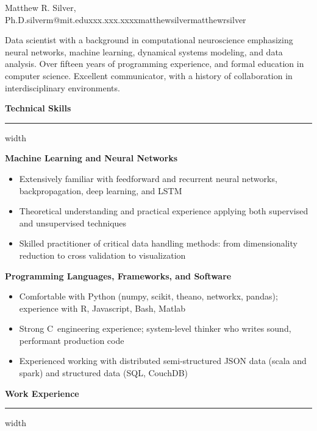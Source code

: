 \documentclass{report}
\newcommand{\CC}{C\nolinebreak\hspace{-.05em}\raisebox{.4ex}{\tiny\bf +}\nolinebreak\hspace{-.10em}\raisebox{.4ex}{\tiny\bf +}}
\newcommand{\sectionheader}[1]
{

  \vspace{.5mm}
  \noindent
  \large
  \textbf{#1}
  \vspace{.5mm}
  \color{mygray}
  \hrule width \textwidth
  \color{black}
  \vspace{3mm}

}
\newenvironment{skillset}[1]
{

  \noindent
  \normalsize
  \textbf{#1}
  \small
  \begin{itemize}[leftmargin=4mm] \setlength{\itemsep}{0cm} \setlength{\parskip}{0cm}

}
{
  \end{itemize}
  \vspace{3mm}
}
\begin{document}

  \begin{resume_header}{Matthew R. Silver, Ph.D.}{silverm@mit.edu}{xxx.xxx.xxxx}{matthewsilver}{matthewrsilver}

    Data scientist with a background in computational neuroscience emphasizing neural networks, machine learning, dynamical systems modeling, and data analysis. Over fifteen years of programming experience, and formal education in computer science. Excellent communicator, with a history of collaboration in interdisciplinary environments.

  \end{resume_header}



  \sectionheader{Technical Skills}

  \begin{skillset}{Machine Learning and Neural Networks}
    \item Extensively familiar with feedforward and recurrent neural networks, backpropagation, deep learning, and LSTM
    \item Theoretical understanding and practical experience applying both supervised and unsupervised techniques
    \item Skilled practitioner of critical data handling methods: from dimensionality reduction to cross validation to visualization
  \end{skillset}

  \begin{skillset}{Programming Languages, Frameworks, and Software}
    \item Comfortable with Python (numpy, scikit, theano, networkx, pandas); experience with R, Javascript, Bash, Matlab
    \item Strong \CC~engineering experience; system-level thinker who writes sound, performant production code
    \item Experienced working with distributed semi-structured JSON data (scala and spark) and structured data (SQL, CouchDB)
  \end{skillset}




  \sectionheader{Work Experience}

\end{document}
